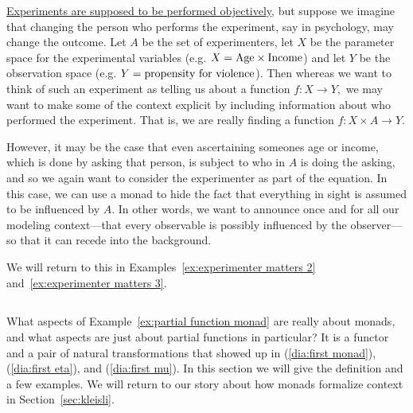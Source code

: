 \documentclass[../main/CT4S-EN-RU]{subfiles}
\begin{document}
\begin{exampleRUS}\label{ex:partial function monad}
\end{exampleRUS}

\begin{applicationENG}\label{app:experimenter matters}
\href{http://en.wikipedia.org/wiki/Observer-expectancy_effect}{\text Experiments are supposed to be performed objectively}, but suppose we imagine that changing the person who performs the experiment, say in psychology, may change the outcome. Let $A$ be the set of experimenters, let $X$ be the parameter space for the experimental variables (e.g. $X=\textnormal{Age}\times\textnormal{Income}$) and let $Y$ be the observation space (e.g. $Y=\textnormal{propensity for violence}$). Then whereas we want to think of such an experiment as telling us about a function $f\colon X{→} Y,$ we may want to make some of the context explicit by including information about who performed the experiment. That is, we are really finding a function $f\colon X\times A{→} Y.$ 

However, it may be the case that even ascertaining someones age or income, which is done by asking that person, is subject to who in $A$ is doing the asking, and so we again want to consider the experimenter as part of the equation. In this case, we can use a monad to hide the fact that everything in sight is assumed to be influenced by $A.$ In other words, we want to announce once and for all our modeling context—that every observable is possibly influenced by the observer—so that it can recede into the background.

We will return to this in Examples~\ref{ex:experimenter matters 2} and~\ref{ex:experimenter matters 3}.
\end{applicationENG}

\begin{applicationRUS}\label{app:experimenter matters}
\end{applicationRUS}


\subsection{}

\begin{blockENG}
What aspects of Example~\ref{ex:partial function monad} are really about monads, and what aspects are just about partial functions in particular? It is a functor and a pair of natural transformations that showed up in (\ref{dia:first monad}), (\ref{dia:first eta}), and (\ref{dia:first mu}). In this section we will give the definition and a few examples. We will return to our story about how monads formalize context in Section~\ref{sec:kleisli}.
\end{blockENG}
\end{document}
